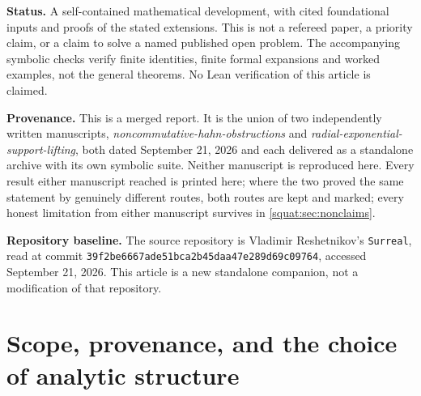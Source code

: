 \documentclass[11pt,letterpaper]{article}
\numberwithin{equation}{section}
\theoremstyle{definition}
\theoremstyle{remark}
\newcommand{\Oz}{\mathbf{Oz}}
\newcommand{\ii}{\mathbf i}
\newcommand{\dH}{\partial_{\mathbb H}}
\begin{document}
\begin{titlepage}
\begin{minipage}{0.95\textwidth}
\begin{abstract}
Two results are negative and sharp. The componentwise Berarducci--Mantova derivation
admits no nonzero solution of $\dH y=\ii y$, so no global quaternionic exponential can
satisfy the usual commuting chain rule for that derivation at $\omega\ii$. And the
global radial exponential built from the Ehrlich--Kaplan scalar normalization, whose
complete logarithm fibres and four-coordinate differential we compute --- finding
rank-two critical spheres at radii in $\pi\Oz$, including the infinite radius
$\omega$ --- is not an additive-to-multiplicative homomorphism on noncommuting
arguments. Three exponentials and four derivative-like operators are therefore fixed by
name and symbol in \cref{squat:sec:ledger} and never identified.
\end{abstract}
\end{minipage}
\vfill
\begin{minipage}{0.95\textwidth}\small
\textbf{Status.} A self-contained mathematical development, with cited foundational
inputs and proofs of the stated extensions. This is not a refereed paper, a priority
claim, or a claim to solve a named published open problem. The accompanying symbolic
checks verify finite identities, finite formal expansions and worked examples, not the
general theorems. No Lean verification of this article is claimed.

\textbf{Provenance.} This is a merged report. It is the union of two independently
written manuscripts, \emph{noncommutative-hahn-obstructions} and
\emph{radial-exponential-support-lifting}, both dated September 21, 2026 and each
delivered as a standalone archive with its own symbolic suite. Neither manuscript is
reproduced here. Every result either
manuscript reached is printed here; where the two proved the same statement by
genuinely different routes, both routes are kept and marked; every honest limitation
from either manuscript survives in \cref{squat:sec:nonclaims}.

\textbf{Repository baseline.} The source repository is Vladimir Reshetnikov's
\texttt{Surreal}, read at commit
\texttt{39f2be6667ade51bca2b45daa47e289d69c09764}, accessed September 21, 2026. This
article is a new standalone companion, not a modification of that repository.
\end{minipage}
\end{titlepage}
\tableofcontents
\clearpage
{}
\hypersetup{pageanchor=true}

\section{Scope, provenance, and the choice of analytic structure}\label{squat:sec:scope}
\end{document}
